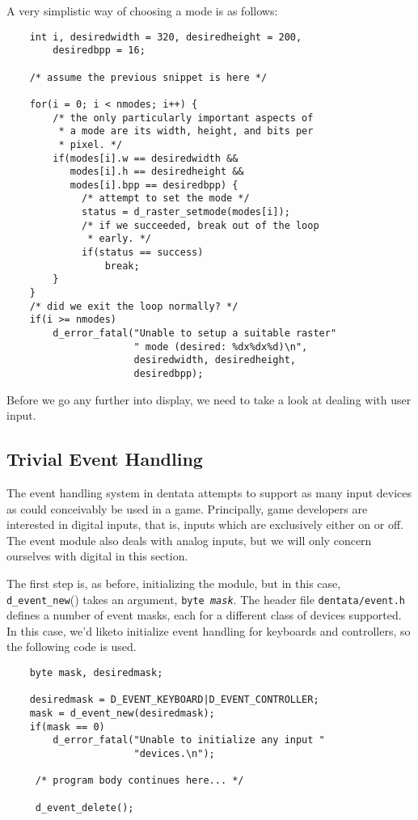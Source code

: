 A very simplistic way of choosing a mode is as follows:
\begin{verbatim}
    int i, desiredwidth = 320, desiredheight = 200,
        desiredbpp = 16;

    /* assume the previous snippet is here */

    for(i = 0; i < nmodes; i++) {
        /* the only particularly important aspects of
         * a mode are its width, height, and bits per
         * pixel. */
        if(modes[i].w == desiredwidth &&
           modes[i].h == desiredheight &&
           modes[i].bpp == desiredbpp) {
             /* attempt to set the mode */
             status = d_raster_setmode(modes[i]);
             /* if we succeeded, break out of the loop
              * early. */
             if(status == success)
                 break;
        }
    }
    /* did we exit the loop normally? */
    if(i >= nmodes)
        d_error_fatal("Unable to setup a suitable raster"
                      " mode (desired: %dx%dx%d)\n",
                      desiredwidth, desiredheight,
                      desiredbpp);
\end{verbatim}

Before we go any further into display, we need to take a look at
dealing with user input.

\subsection{Trivial Event Handling}

The event handling system in dentata attempts to support as many input
devices as could conceivably be used in a game. Principally, game
developers are interested in digital inputs, that is, inputs which are
exclusively either on or off. The event module also deals with analog
inputs, but we will only concern ourselves with digital in this
section.

The first step is, as before, initializing the module, but in this
case, {\tt d\_event\_new}() takes an argument, {\tt byte \it mask}.
The header file {\tt dentata/event.h} defines a number of event masks,
each for a different class of devices supported. In this case, we'd
liketo initialize event handling for keyboards and controllers, so
the following code is used.

\begin{verbatim}
    byte mask, desiredmask;

    desiredmask = D_EVENT_KEYBOARD|D_EVENT_CONTROLLER;
    mask = d_event_new(desiredmask);
    if(mask == 0)
        d_error_fatal("Unable to initialize any input "
                      "devices.\n");

     /* program body continues here... */

     d_event_delete();
\end{verbatim}

